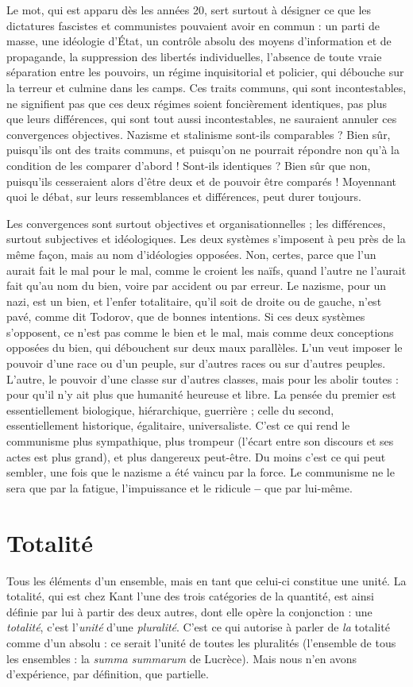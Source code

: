 Le mot, qui est apparu dès les années 20, sert surtout à désigner ce que les
dictatures fascistes et communistes pouvaient avoir en commun : un parti de
masse, une idéologie d’État, un contrôle absolu des moyens d’information et de
propagande, la suppression des libertés individuelles, l’absence de toute vraie
séparation entre les pouvoirs, un régime inquisitorial et policier, qui débouche
sur la terreur et culmine dans les camps. Ces traits communs, qui sont incontestables,
ne signifient pas que ces deux régimes soient foncièrement identiques,
pas plus que leurs différences, qui sont tout aussi incontestables, ne sauraient
annuler ces convergences objectives. Nazisme et stalinisme sont-ils
comparables ? Bien sûr, puisqu'ils ont des traits communs, et puisqu’on ne
pourrait répondre non qu’à la condition de les comparer d’abord ! Sont-ils
identiques ? Bien sûr que non, puisqu'ils cesseraient alors d’être deux et de pouvoir
être comparés ! Moyennant quoi le débat, sur leurs ressemblances et différences,
peut durer toujours.

Les convergences sont surtout objectives et organisationnelles ; les différences,
surtout subjectives et idéologiques. Les deux systèmes s’imposent à peu
près de la même façon, mais au nom d’idéologies opposées. Non, certes, parce
que l’un aurait fait le mal pour le mal, comme le croient les naïfs, quand l’autre
ne l’aurait fait qu’au nom du bien, voire par accident ou par erreur. Le nazisme,
pour un nazi, est un bien, et l’enfer totalitaire, qu’il soit de droite ou de
gauche, n’est pavé, comme dit Todorov, que de bonnes intentions. Si ces deux
systèmes s'opposent, ce n’est pas comme le bien et le mal, mais comme deux
conceptions opposées du bien, qui débouchent sur deux maux parallèles. L’un
veut imposer le pouvoir d’une race ou d’un peuple, sur d’autres races ou sur
d’autres peuples. L'autre, le pouvoir d’une classe sur d’autres classes, mais
pour les abolir toutes : pour qu’il n’y ait plus que humanité heureuse et libre.
La pensée du premier est essentiellement biologique, hiérarchique, guerrière ;
celle du second, essentiellement historique, égalitaire, universaliste. C’est ce
qui rend le communisme plus sympathique, plus trompeur (l'écart entre son
discours et ses actes est plus grand), et plus dangereux peut-être. Du moins
c’est ce qui peut sembler, une fois que le nazisme a été vaincu par la force. Le
communisme ne le sera que par la fatigue, l'impuissance et le ridicule {\bf --} que
par lui-même.

\section{Totalité}
Tous les éléments d’un ensemble, mais en tant que celui-ci constitue
une unité. La totalité, qui est chez Kant l’une des trois catégories
de la quantité, est ainsi définie par lui à partir des deux autres, dont elle
opère la conjonction : une {\it totalité}, c’est l'{\it unité} d’une {\it pluralité}. C'est ce qui
autorise à parler de {\it la} totalité comme d’un absolu : ce serait l’unité de toutes les
pluralités (l’ensemble de tous les ensembles : la {\it summa summarum} de Lucrèce).
Mais nous n’en avons d’expérience, par définition, que partielle.


